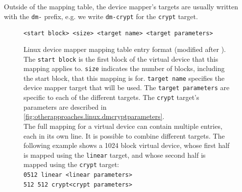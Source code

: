 Outside of the mapping table, the device mapper's targets are usually written with the \texttt{dm-} prefix, e.g. we write \texttt{dm-crypt} for the \texttt{crypt} target.

\begin{figure}[htb!]
	\center
	\begin{mdframed}
		\texttt{<start block> <size> <target name> <target parameters>}
	\end{mdframed}
	\caption[
		Linux device mapper mapping table entry format
	]{
		Linux device mapper mapping table entry format (modified after \cite{Dmcrypt2020}). The \texttt{start block} is the first block of the virtual device that this mapping applies to. \texttt{size} indicates the number of blocks, including the start block, that this mapping is for. \texttt{target name} specifies the device mapper target that will be used. The \texttt{target parameters} are specific to each of the different targets. The \texttt{crypt} target's parameters are described in \autoref{fig:otherapproaches.linux.dmcryptparameters}.\\
		The full mapping for a virtual device can contain multiple entries, each in its own line. It is possible to combine different targets. The following example shows a 1024 block virtual device, whose first half is mapped using the \texttt{linear} target, and whose second half is mapped using the \texttt{crypt} target:\\
		\texttt{0\space\space\space{}512 linear <linear parameters>}\\
		\texttt{512 512 crypt\space\space{}<crypt parameters>}
	}
	\label{fig:otherapproaches.linux.mappingtable}
\end{figure}

